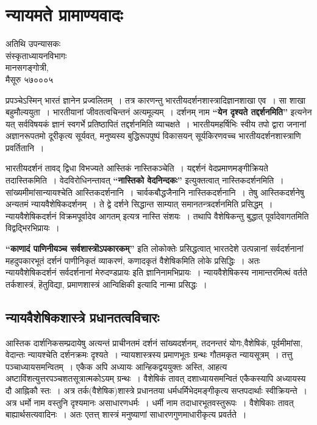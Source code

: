 {\fontsize{15}{17}\selectfont
\presetvalues
\chapter{न्यायमते प्रामाण्यवादः}

\begin{center}
\smallskip
अतिथि उपन्यासकः\\
संस्कृताध्यायनविभागः\\
मानसगङ्गोत्री,\\ 
मैसूरु ५७०००५
\addrule
\end{center}
प्रपञ्चेऽस्मिन् भारतं ज्ञानेन प्रज्वलितम्~। तत्र कारणन्तु भारतीयदर्शनशास्त्रादिज्ञानशाखा एव~। सा शाखा बहुमौल्ययुता~। भारतीयानां जीवतत्वचिन्तनं अत्यमूल्यम्~। दर्शनम् नाम \textbf{“येन दृश्यते तद्दर्शनमिति”} इत्यनेन यत् सर्वविषयकं ज्ञानं स्वगर्भे प्रतिष्ठापितं तद्दर्शनमिति व्याचक्षते~। भारतीयमहर्षिभिः स्वीय तपो द्वारा जनानां अज्ञानरूपतमो दूरीकृत्य सूर्यवत्, मनुष्यस्य बुद्धिरूपपुष्पं विकासयन् सूर्यकिरणवच्च भारतीयदर्शनशास्त्राणि प्रवर्तितानि~। 

भारतीयदर्शनं तावद् द्विधा विभज्यते आस्तिकं नास्तिकञ्चेति~। यद्दर्शनं वेदप्रमाण\-मङ्गीक्रियते तदास्तिकमिति~। वेदविरोधिनन्तावत् \textbf{“नास्तिको वेदनिन्दकः”} इत्युक्तत्वात् नास्तिकदर्शनमिति~। सांख्यमीमांसान्यायश्चेति आस्तिकदर्शनानि~। चार्वकबौद्धजैनानि नास्तिकदर्शनानि~। तेषु आस्तिकदर्शनेषु अन्यतमं न्यायवैशेषिकदर्शनम्~। ते द्वे दर्शने सिद्धान्त साम्यात् समानतन्त्रदर्शनमिति प्रसिद्धम्~। न्यायवैशेषिकदर्शनं विक्रमपूर्वादेव आगतम् इत्यत्र नास्ति संशयः~। तथापि वैशेषिकन्तु बुद्धात् पूर्वादेवागतमिति विद्वद्भिरभिप्रायः~। 

\textbf{“काणादं पाणिनीयञ्च सर्वशास्त्रॊऽपकारकम्”} इति लोकोक्तेः प्रसिद्धत्वात् भारतदेशे उत्पन्नानां सर्वदर्शनानां महदुपकारभूतं दर्शनं पाणीनिकृतं व्याकरणं, कणादकृतं वैशेषिकमिति लोके प्रसिद्धिः~। अतः न्यायवैशेषिकदर्शनं सर्वदर्शनानां मेरुदण्डप्रायः इति ज्ञानिनामभिप्रायः~। न्यायवैशेषिकस्य नामान्तरमित्थं वर्तते तर्कशास्त्रं, हॆतुविद्या, प्रमाणशास्त्रं आन्विक्षिकी इत्यादि नान्मा प्रसिद्धः~। 

\section*{न्यायवैशेषिकशास्त्रे प्रधानतत्वविचारः}

आस्तिक दार्शनिकसम्प्रदायेषु अत्यन्तं प्राचीनतमं दर्शनं सांख्यदर्शनम्, तदनन्तरं योगः,\break वैशेषिकं, पूर्वमीमांसा, वेदान्तः न्यायश्चेति दर्शनक्रमः दृश्यते~। न्यायशास्त्रस्य प्रमाणभूतः ग्रन्थः गौतमकृत न्यायसूत्रम्~। तत्तु पञ्चाध्यायसमन्वितम्~। एकैक अपि अध्यायः आन्हिकद्वययुक्तः अस्ति, आहत्य अष्टाविंशत्युत्तरपञ्चशतसूत्रात्मकोऽयम् ग्रन्थः~। वैशेषिकं तावत् दशाध्यायसमन्वितं एकैकस्यापि अध्यायस्य दौ आह्निकौ स्तः~। अत्र तर्क(वैशेषिक)शास्त्रे प्रधानतया धर्मधर्मिभेदमङ्गीकृत्य सप्तपदार्थाः स्वीक्रियन्ते~। अत्र धर्मो नाम वस्तुनि दृश्यमानः असाधारणधर्मः~। धर्मी नाम तदाधारभूतवस्तुरूपः~। वैशेषिकाः तावत् बाह्यार्थसत्यवादिनः~। अतः एतत्त् शास्त्रं मनुष्याणां साधारणगुणमाधारीकृत्य प्रवर्तते~। 

}
